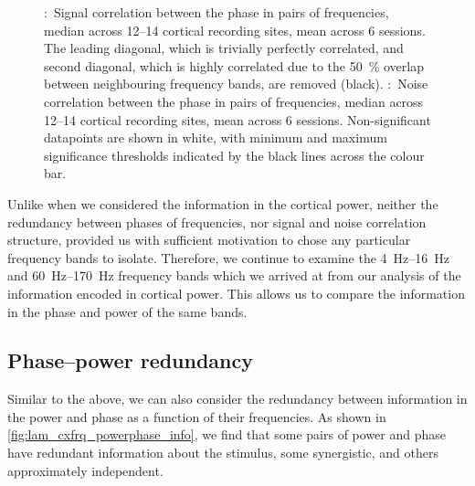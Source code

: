 \begin{figure}[htbp]
    \centering
    \hspace*{\fill}
    \hspace*{\fill}\hspace{.2cm}\hspace*{\fill}
    \hspace*{\fill}
    \caption{
\protect{}:~Signal correlation between the phase in pairs of frequencies, median across \numrange{12}{14} cortical recording sites, mean across \num{6} sessions.
The leading diagonal, which is trivially perfectly correlated, and second diagonal, which is highly correlated due to the \SI{50}{\percent} overlap between neighbouring frequency bands, are removed (black).
\protect{}:~Noise correlation between the phase in pairs of frequencies, median across \numrange{12}{14} cortical recording sites, mean across \num{6} sessions.
Non-significant datapoints are shown in white, with minimum and maximum significance thresholds indicated by the black lines across the colour bar.
}
\label{fig:lam_noisesignal_corr_phase}
\end{figure}


Unlike when we considered the information in the cortical power, neither the redundancy between phases of frequencies, nor signal and noise correlation structure, provided us with sufficient motivation to chose any particular frequency bands to isolate.
Therefore, we continue to examine the \SIrange{4}{16}{Hz} and \SIrange{60}{170}{Hz} frequency bands which we arrived at from our analysis of the information encoded in cortical power.
This allows us to compare the information in the phase and power of the same bands.


\subsection{Phase--power redundancy}

Similar to the above, we can also consider the redundancy between information in the power and phase as a function of their frequencies.
As shown in \autoref{fig:lam_cxfrq_powerphase_info}, we find that some pairs of power and phase have redundant information about the stimulus, some synergistic, and others approximately independent.


